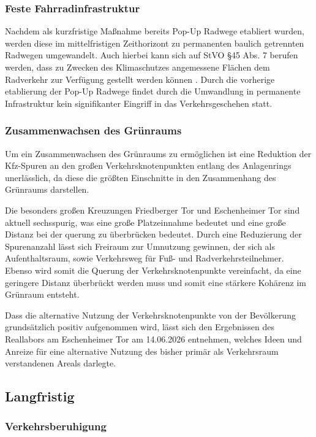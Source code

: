 \documentclass[a4paper,12pt]{article}
\begin{document}
\subsubsection{Feste Fahrradinfrastruktur}

Nachdem als kurzfristige Maßnahme bereits Pop-Up Radwege etabliert wurden, werden diese im mittelfristigen Zeithorizont zu permanenten baulich getrennten Radwegen umgewandelt. Auch hierbei kann sich auf StVO §45 Abs. 7 berufen werden, dass zu Zwecken des Klimaschutzes angemessene Flächen dem Radverkehr zur Verfügung gestellt werden können \autocite{VerkehrszeichenUndVerkehrseinrichtungen}. Durch die vorherige etablierung der Pop-Up Radwege findet durch die Umwandlung in permanente Infrastruktur kein signifikanter Eingriff in das Verkehrsgeschehen statt.

\subsubsection{Zusammenwachsen des Grünraums}

Um ein Zusammenwachsen des Grünraums zu ermöglichen ist eine Reduktion der Kfz-Spuren an den großen Verkehrsknotenpunkten entlang des Anlagenrings unerlässlich, da diese die größten Einschnitte in den Zusammenhang des Grünraums darstellen.

Die besonders großen Kreuzungen Friedberger Tor und Eschenheimer Tor sind aktuell sechsspurig, was eine große Platzeinnahme bedeutet und eine große Distanz bei der querung zu überbrücken bedeutet. Durch eine Reduzierung der Spurenanzahl lässt sich Freiraum zur Umnutzung gewinnen, der sich als Aufenthaltsraum, sowie Verkehrsweg für Fuß- und Radverkehrsteilnehmer. Ebenso wird somit die Querung der Verkehrsknotenpunkte vereinfacht, da eine geringere Distanz überbrückt werden muss und somit eine stärkere Kohärenz im Grünraum entsteht.

Dass die alternative Nutzung der Verkehrsknotenpunkte von der Bevölkerung grundsätzlich positiv aufgenommen wird, lässt sich den Ergebnissen des Reallabors am Eschenheimer Tor am 14.06.2026 entnehmen, welches Ideen und Anreize für eine alternative Nutzung des bisher primär als Verkehrsraum verstandenen Areals darlegte.

\subsection{Langfristig}

\FloatBarrier
\subsubsection{Verkehrsberuhigung}
\end{document}
